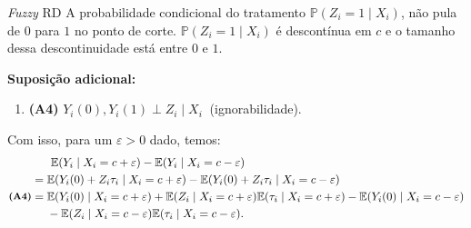 \documentclass[aspectratio=1610, 10pt]{beamer}
\begin{document}
\begin{frame}{\textit{Fuzzy} RD}
    \justifying
    A probabilidade condicional do tratamento $\mathbb{P}(Z_i = 1 \mid X_i)$, não pula de $0$ para $1$ no ponto de corte. $\mathbb{P}(Z_i = 1 \mid X_i)$ é descontínua em $c$ e o tamanho dessa descontinuidade está entre $0$ e $1$.
    \vspace{0.3cm}

    \textbf{Suposição adicional:}
    \begin{enumerate}
        \item[] \textbf{(A4)} $Y_i(0), Y_i(1) \perp Z_i  \mid  X_i \ $ (ignorabilidade).
    \end{enumerate}
    \vspace{0.3cm}

    Com isso, para um $\varepsilon >0$ dado, temos:
    \begin{align*}
        & \ \ \ \ \ \mathbb{E}(Y_i \mid X_i = c + \varepsilon) - \mathbb{E}(Y_i \mid X_i = c - \varepsilon) \\
        &=  \mathbb{E}(Y_i(0) + Z_i \tau_i \mid X_i = c + \varepsilon) - \mathbb{E}(Y_i(0) + Z_i \tau_i \mid X_i = c - \varepsilon) \\
      \text{\raisebox{0.2ex}{\footnotesize{\textbf{(A4)}}}} &= \mathbb{E}(Y_i(0) \mid X_i = c + \varepsilon) + \mathbb{E}(Z_i \mid X_i = c + \varepsilon) \mathbb{E}(\tau_i \mid X_i = c + \varepsilon) - \mathbb{E}(Y_i(0) \mid X_i = c - \varepsilon) \\
        & \ \ \ \ - \mathbb{E}(Z_i \mid X_i = c - \varepsilon) \mathbb{E}(\tau_i \mid X_i = c - \varepsilon).
    \end{align*}
\end{frame}
\end{document}
